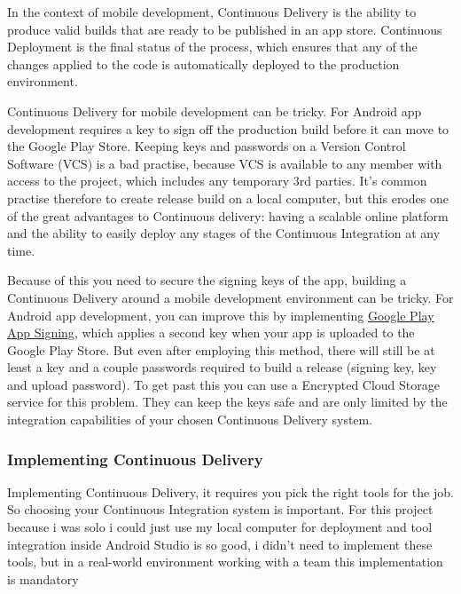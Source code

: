 In the context of mobile development, Continuous Delivery is the ability to produce valid builds that are ready to be published in an app store. Continuous Deployment is the final status of the process, which ensures that any of the changes applied to the code is automatically deployed to the production environment.\newline

Continuous Delivery for mobile development can be tricky. For Android app development requires a key to sign off the production build before it can move to the Google Play Store. Keeping keys and passwords on a Version Control Software (VCS) is a bad practise, because VCS is available to any member with access to the project, which includes any temporary 3rd parties. It's common practise therefore to create release build on a local computer, but this erodes one of the great advantages to Continuous delivery: having a scalable online platform and the ability to easily deploy any stages of the Continuous Integration at any time.\cite{Cont_delivery_1} \newline

Because of this you need to secure the signing keys of the app, building a Continuous Delivery around a mobile development environment can be tricky. For Android app development, you can improve this by implementing \hyperlink{https://developer.android.com/studio/publish/app-signing}{Google Play App Signing}, which applies a second key when your app is uploaded to the Google Play Store. But even after employing this method, there will still be at least a key and a couple passwords required to build a release (signing key, key and upload password). To get past this you can use a Encrypted Cloud Storage service for this problem. They can keep the keys safe and are only limited by the integration capabilities of your chosen Continuous Delivery system.
\newpage
\subsubsection{Implementing Continuous Delivery}
Implementing Continuous Delivery, it requires you pick the right tools for the job. So choosing your Continuous Integration system is important. For this project because i was solo i could just use my local computer for deployment and tool integration inside Android Studio is so good, i didn't need to implement these tools, but in a real-world environment working with a team this implementation is mandatory \newline

